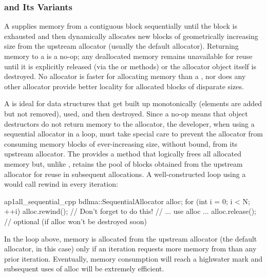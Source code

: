 \subsubsection{ and Its Variants}

A  supplies memory from a contiguous block
sequentially until the block is exhausted and then dynamically allocates new
blocks of geometrically increasing size from the upstream allocator (usually the
default allocator). Returning memory to a  is a no-op;
any deallocated memory remains unavailable for reuse until it is explicitly
released (via the  or  methods) or the allocator object itself is
destroyed. No allocator is faster for allocating memory than a
, nor does any other allocator provide better
locality for allocated blocks of disparate sizes.

A  is ideal for data structures that get built up
monotonically (elements are added but not removed), used, and then
destroyed. Since a no-op  means that object destructors do not
return memory to the allocator, the developer, when using a sequential
allocator in a loop, must take special care to prevent the allocator from
consuming memory blocks of ever-increasing size, without bound, from its
upstream allocator. The  provides a 
method that logically frees all allocated memory but, unlike , retains
the pool of blocks obtained from the upstream allocator for reuse in
subsequent allocations. A well-constructed loop using a
 would call rewind in every iteration:
\begin{cppcodeblock}{ap1all_sequential_cpp}
    bdlma::SequentialAllocator alloc;
    for (int i = 0; i < N; ++i) {
        alloc.rewind(); // Don't forget to do this!
        // ... use alloc ...
    }
    alloc.release(); // optional (if alloc won't be destroyed soon)
\end{cppcodeblock}
In the loop above, memory is allocated from the upstream allocator (the default
allocator, in this case) only if an iteration requests more memory from 
than any prior iteration. Eventually, memory consumption will reach a highwater mark and subsequent uses of alloc will be extremely efficient.

